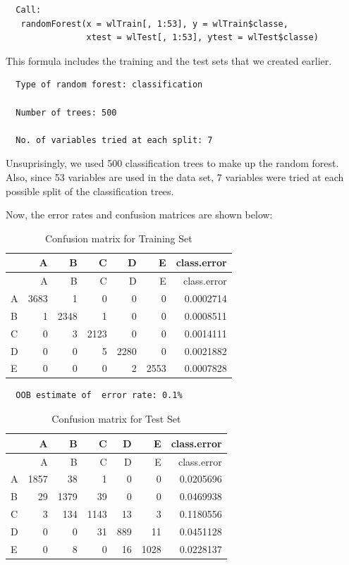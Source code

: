 \documentclass[12pt,twoside]{reedthesis}
\begin{document}
  \begin{verbatim}
  Call:
   randomForest(x = wlTrain[, 1:53], y = wlTrain$classe,
                xtest = wlTest[, 1:53], ytest = wlTest$classe) 
  \end{verbatim}
  
  This formula includes the training and the test sets that we created
  earlier.
  
  \begin{verbatim}
  Type of random forest: classification
  
  Number of trees: 500
  
  No. of variables tried at each split: 7
  \end{verbatim}
  
  Unsuprisingly, we used 500 classification trees to make up the random
  forest. Also, since 53 variables are used in the data set, 7 variables
  were tried at each possible split of the classification trees. \newpage
  
  Now, the error rates and confusion matrices are shown below:
  
  \begin{longtable}[c]{@{}lrrrrrr@{}}
  \caption{Confusion matrix for Training Set}\tabularnewline
  \toprule
  & A & B & C & D & E & class.error\tabularnewline
  \midrule
  \endfirsthead
  \toprule
  & A & B & C & D & E & class.error\tabularnewline
  \midrule
  \endhead
  A & 3683 & 1 & 0 & 0 & 0 & 0.0002714\tabularnewline
  B & 1 & 2348 & 1 & 0 & 0 & 0.0008511\tabularnewline
  C & 0 & 3 & 2123 & 0 & 0 & 0.0014111\tabularnewline
  D & 0 & 0 & 5 & 2280 & 0 & 0.0021882\tabularnewline
  E & 0 & 0 & 0 & 2 & 2553 & 0.0007828\tabularnewline
  \bottomrule
  \end{longtable}
  
  \begin{verbatim}
  OOB estimate of  error rate: 0.1%
  \end{verbatim}
  
  \begin{longtable}[c]{@{}lrrrrrr@{}}
  \caption{Confusion matrix for Test Set}\tabularnewline
  \toprule
  & A & B & C & D & E & class.error\tabularnewline
  \midrule
  \endfirsthead
  \toprule
  & A & B & C & D & E & class.error\tabularnewline
  \midrule
  \endhead
  A & 1857 & 38 & 1 & 0 & 0 & 0.0205696\tabularnewline
  B & 29 & 1379 & 39 & 0 & 0 & 0.0469938\tabularnewline
  C & 3 & 134 & 1143 & 13 & 3 & 0.1180556\tabularnewline
  D & 0 & 0 & 31 & 889 & 11 & 0.0451128\tabularnewline
  E & 0 & 8 & 0 & 16 & 1028 & 0.0228137\tabularnewline
  \bottomrule
  \end{longtable}
  
\end{document}
